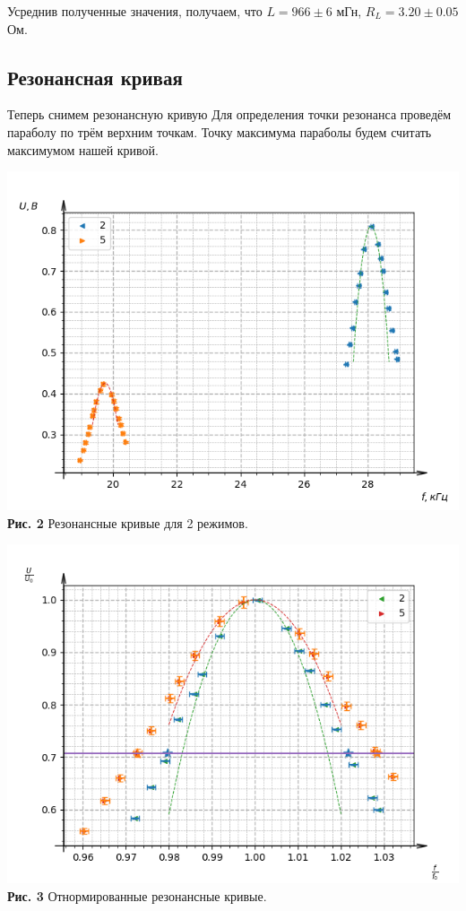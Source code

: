 \documentclass[a4paper, 12pt]{article}%
\begin{document}
Усреднив полученные значения, получаем, что $L=966 \pm 6$ мГн, $R_L=3.20 \pm 0.05$ Ом.
\subsection*{Резонансная кривая}
Теперь снимем резонансную кривую %
Для определения точки резонанса проведём параболу по трём верхним точкам. Точку максимума параболы будем считать максимумом нашей кривой. 

\begin{center}
\includegraphics[width=\textwidth]{Figure_1.png}\\
\textbf{Рис. 2} Резонансные кривые для 2 режимов.
\end{center}

\begin{center}
\includegraphics[width=\textwidth]{Figure_2.png}\\
\textbf{Рис. 3} Отнормированные резонансные кривые.
\end{center}
\end{document}
